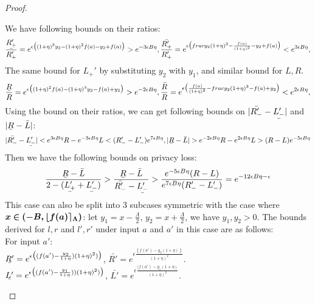 \documentclass[a4paper,11pt]{article}
\begin{document}
\begin{proof}
\begin{itemize}

		We have following bounds on their ratios:
		\[
		\frac{\ubar{R_+'}}{R_+'} = e^{\epsilon 
		\big(
		(1 + \eta)^3 y_2 - (1 + \eta)^2f(a) - y_2 + f(a)
		\big)}
		> e^{-3\epsilon B \eta},
		\frac{\bar{R_+'}}{R_+'} = e^{\epsilon 
		\big(
		frac{y_2}{(1 + \eta)^3} - \frac{f(a)}{(1 + \eta)^2} - y_2 + f(a)
		\big)}
		< e^{3\epsilon B \eta},
		\]
		The same bound for $L_+'$ by substituting $y_2$ with $y_1$, and similar bound for $L, R$.
		\[
		\frac{\ubar{R}}{R} = e^{\epsilon 
		\big(
		(1 + \eta)^2f(a) - (1 + \eta)^3 y_2 - f(a) + y_2
		\big)}
		> e^{-2\epsilon B \eta},
		\frac{\bar{R}}{R} = e^{\epsilon 
		\big(
		\frac{f(a)}{(1 + \eta)^2} - frac{y_2}{(1 + \eta)^3} - f(a) + y_2
		\big)}
		< e^{2\epsilon B \eta},
		\]
		Using the bound on their ratios, we can get following bounds on $|\bar{R_-'} - \ubar{L_-'}|$ and $|\ubar{R} - \bar{L}|$:
		\[
		|\bar{R_-'} - \ubar{L_-'}| < e^{3\epsilon B \eta} R - e^{-3\epsilon B \eta}L < (R_-' - L_-') e^{7\epsilon B \eta},
		|\ubar{R} - \bar{L}| > e^{-2\epsilon B \eta} R - e^{2\epsilon B \eta}L > (R - L) e^{-5\epsilon B \eta}
		\]
		Then we have the following bounds on privacy loss:
		\[
		\frac{\ubar{R} - \bar{L}}{2 - (\ubar{L_+'} + \ubar{L_-'})}
		> \frac{\ubar{R} - \bar{L}}{\bar{R_-'} - \ubar{L_-'}}
		> \frac{e^{-5\epsilon B \eta} (R - L)}
		{e^{7\epsilon B \eta}(R_-' - L_-')}
		= e^{-12\epsilon B \eta - \epsilon}
		\]
		This case can also be split into 3 subcases symmetric with the case where $\boldsymbol{x \in  (-B, \lfloor f(a) \rceil_{\Lambda})}$:
		let $y_1 = x - \frac{\Lambda}{2}$, $y_2 = x + \frac{\Lambda}{2}$, we have $y_1, y_2 > 0$. The bounds derived for $l, r$ and $l', r'$ under input $a$ and $a'$ in this case are as follows:
		\\
		For input $a'$:
		\\
		$\ubar{R'} = e^{\epsilon 
				\big( (f(a') - \frac{y_2}{1 + \eta}) (1 + \eta)^2) \big)}$, 
		$\bar{R'} = e^{\epsilon 
				\frac{(f(a') - y_2(1 + \eta))}{(1 + \eta)^2}}$.
		\\
		$\ubar{L'} = e^{\epsilon 
				\big( (f(a') - \frac{y_1}{1 + \eta})) (1 + \eta)^2) \big)}$,
		$\bar{L'} = e^{\epsilon 
				\frac{(f(a') - y_1(1 + \eta)}{(1 + \eta)^2}}$.

\end{itemize}
\end{proof}
\end{document}
